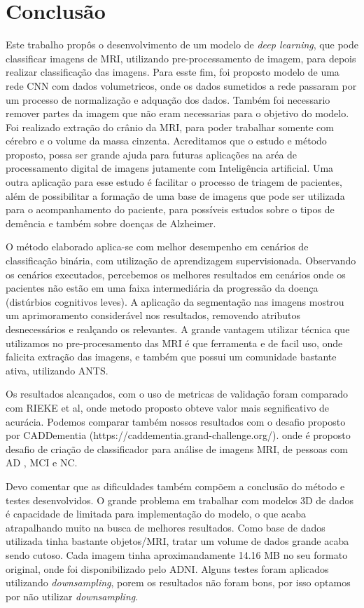 \documentclass[openright]{UFRGS} %
\begin{document}
\chapter{Conclusão}

Este trabalho propôs o desenvolvimento de um modelo de \textit{deep learning}, que pode classificar imagens de MRI,
utilizando pre-processamento de imagem, para depois realizar classificação das imagens. Para esste fim, foi proposto modelo de uma rede CNN com dados
volumetricos, onde os dados sumetidos a rede passaram por um processo de
normalização e adquação dos dados. Também foi necessario  remover partes da imagem que não eram  necessarias para o objetivo do modelo. Foi realizado  extração do crânio da MRI, para poder trabalhar somente com cérebro e o volume da massa cinzenta. Acreditamos que o estudo e método proposto, possa ser grande ajuda para futuras aplicações na aréa de processamento digital de imagens jutamente com  Inteligência artificial. Uma outra aplicação para esse  estudo é facilitar o
processo de triagem de pacientes, além de
possibilitar a formação de uma base de imagens 
que pode ser utilizada para o acompanhamento do paciente,
para possíveis estudos sobre o tipos de demência  e também sobre doenças de Alzheimer.


O método elaborado aplica-se com melhor desempenho em cenários de classificação
binária, com utilização de aprendizagem supervisionada. Observando os cenários executados, percebemos os melhores resultados em cenários onde os pacientes não estão em
uma faixa intermediária da progressão da doença (distúrbios cognitivos leves). A aplicação da segmentação nas imagens mostrou um aprimoramento considerável nos resultados, removendo atributos desnecessários e realçando os relevantes. A grande vantagem utilizar técnica que utilizamos no pre-procesamento das MRI é que ferramenta e de facil uso, onde falicita extração  das imagens, e também que possui um comunidade bastante ativa, utilizando ANTS.

Os resultados alcançados, com o uso de metricas de validação foram 
comparado com   RIEKE et al, onde metodo proposto obteve valor mais segnificativo de acurácia. Podemos comparar também nossos resultados com
o desafio proposto por CADDementia (https://caddementia.grand-challenge.org/). onde é proposto desafio de criação de classificador para análise de imagens MRI, de pessoas com AD
, MCI e NC. 


Devo comentar que as dificuldades também compõem a conclusão do método e testes desenvolvidos. O grande problema em trabalhar com
modelos 3D de dados é capacidade de   limitada para implementação do modelo, o que acaba atrapalhando muito na busca de melhores resultados. Como base de dados utilizada tinha bastante objetos/MRI, tratar  um volume de dados grande  acaba sendo cutoso.
Cada imagem tinha aproximandamente 14.16 MB  no seu formato original, onde foi disponibilizado pelo ADNI. Alguns testes foram  aplicados utilizando 
\textit{downsampling}, porem os resultados não foram bons, por isso optamos por não utilizar \textit{downsampling}. 
\end{document}
